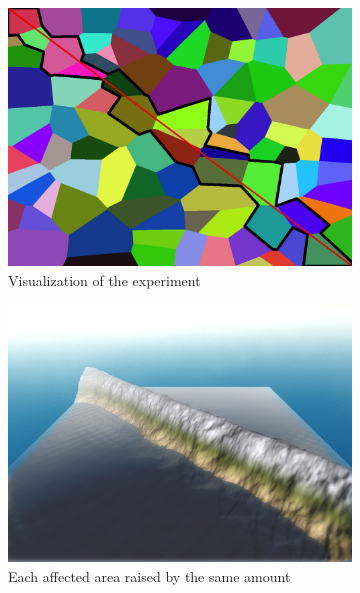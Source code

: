 \documentclass[11pt,a4paper,twoside,openright]{report}
\begin{document}
\begin{figure}[h]
  \centering
  \begin{subfigure}[b]{0.32\textwidth}
    \includegraphics[width=\textwidth]{voronoi100-diagonal.png}
    \caption{Visualization of the experiment}
    \label{fig:voronoi2diagonal}
  \end{subfigure}
  \begin{subfigure}[b]{0.32\textwidth}
    \includegraphics[width=\textwidth]{mountain-range-normal.png}
    \caption{Each affected area raised by the same amount}
    \label{fig:mountainrangenormal}
  \end{subfigure}
  \begin{subfigure}[b]{0.32\textwidth}

\end{subfigure}
\end{figure}
\end{document}

